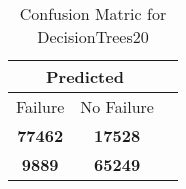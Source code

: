 \begin{table}[] 
\caption{Confusion Matric for DecisionTrees20} 
\label{Table: Prediction Accuracy-NoneDecisionTrees20OnlySunEKF-ignoreReflection-Reflection} 
\centering 
\begin{tabular} 
 {@{}ccc@{}} 
\toprule 
\multicolumn{2}{c}{\textbf{Predicted}}
 \\ \midrule 
\multicolumn{1}{|c|}{Failure} & 
\multicolumn{1}{c|}{No Failure}
 \\ \midrule 
\multicolumn{1}{|c|}{\color{green}\textbf{77462}} & 
\multicolumn{1}{c|}{\color{red}\textbf{17528}}
 \\ \midrule 
\multicolumn{1}{|c|}{\color{red}\textbf{9889}} & 
\multicolumn{1}{c|}{\color{green}\textbf{65249}}
 \\ \bottomrule 
\end{tabular} 
\end{table} 
